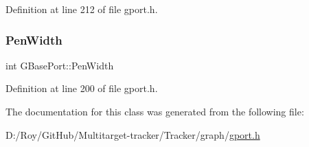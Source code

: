 Definition at line 212 of file gport.\+h.

\mbox{\label{class_g_base_port_a9a76c3a8af8d0e9f29035d02d8f038c1}} 
\subsubsection{\texorpdfstring{Pen\+Width}{PenWidth}}
{\footnotesize\ttfamily int G\+Base\+Port\+::\+Pen\+Width\hspace{0.3cm}{\ttfamily [protected]}}



Definition at line 200 of file gport.\+h.



The documentation for this class was generated from the following file\+:\begin{DoxyCompactItemize}
\item 
D\+:/\+Roy/\+Git\+Hub/\+Multitarget-\/tracker/\+Tracker/graph/\mbox{\hyperlink{gport_8h}{gport.\+h}}\end{DoxyCompactItemize}
